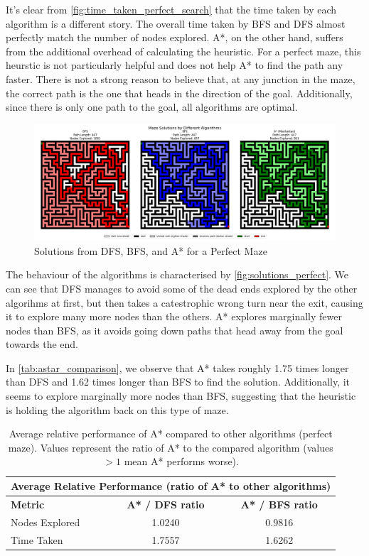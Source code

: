 \documentclass{article}
\begin{document}
It's clear from \autoref{fig:time_taken_perfect_search} that the time taken by each algorithm is a different story. The overall time taken by BFS and DFS almost perfectly match the number of nodes explored. A*, on the other hand, suffers from the additional overhead of calculating the heuristic. For a perfect maze, this heurstic is not particularly helpful and does not help A* to find the path any faster. There is not a strong reason to believe that, at any junction in the maze, the correct path is the one that heads in the direction of the goal. Additionally, since there is only one path to the goal, all algorithms are optimal. 

\begin{figure}[h]
    \centering
    \includegraphics[width=\textwidth]{Solutions_perfectt.png}
    \caption{Solutions from DFS, BFS, and A* for a Perfect Maze}
    \label{fig:solutions_perfect}
\end{figure}

The behaviour of the algorithms is characterised by \autoref{fig:solutions_perfect}. We can see that DFS manages to avoid some of the dead ends explored by the other algorihms at first, but then takes a catestrophic wrong turn near the exit, causing it to explore many more nodes than the others. A* explores marginally fewer nodes than BFS, as it avoids going down paths that head away from the goal towards the end.

In \autoref{tab:astar_comparison}, we observe that A* takes roughly 1.75 times longer than DFS and 1.62 times longer than BFS to find the solution. Additionally, it seems to explore marginally more nodes than BFS, suggesting that the heuristic is holding the algorithm back on this type of maze.

\begin{table}[h]
    \centering
    \begin{tabular}{|l|c|c|}
        \hline
        \multicolumn{3}{|c|}{\textbf{Average Relative Performance (ratio of A* to other algorithms)}} \\
        \hline
        \textbf{Metric} & \textbf{A* / DFS ratio} & \textbf{A* / BFS ratio} \\
        \hline
        Nodes Explored & 1.0240 & 0.9816 \\
        \hline
        Time Taken & 1.7557 & 1.6262 \\
        \hline
    \end{tabular}
    \caption{Average relative performance of A* compared to other algorithms (perfect maze). Values represent the ratio of A* to the compared algorithm (values $> 1$ mean A* performs worse).}
    \label{tab:astar_comparison}
\end{table}
\end{document}
